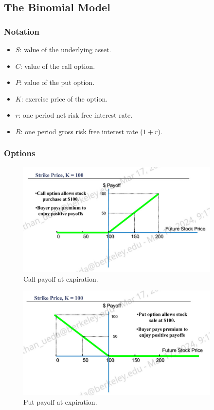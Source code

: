\documentclass[11pt]{article}
\begin{document}
\subsection{The Binomial Model}

\subsubsection{Notation}
\begin{itemize}
    \item $S$: value of the underlying asset.
    \item $C$: value of the call option.
    \item $P$: value of the put option.
    \item $K$: exercise price of the option.
    \item $r$: one period net risk free interest rate.
    \item $R$: one period gross risk free interest rate ($1+r$).
\end{itemize}

\subsubsection{Options}

\begin{figure}[H] 
    \centering 
    \includegraphics[width=4in]{imgs/call_payoff.png}
    \caption{Call payoff at expiration.}
\end{figure}

\begin{figure}[H] 
    \centering 
    \includegraphics[width=4in]{imgs/put_payoff.png}
    \caption{Put payoff at expiration.}
\end{figure}
\end{document}
